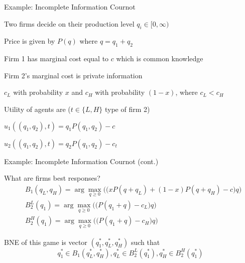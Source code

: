 \documentclass[11pt,aspectratio=169]{beamer}
\begin{document}
  
  \begin{frame}{Example: Incomplete Information Cournot}
   \begin{itemizes}[0.7em]
    \item Two firms decide on their production level $q_i \in [0, \infty)$
    \item Price is given by $P(q)$ where $q = q_1 + q_2$
    \item Firm 1 has marginal cost equal to $c$ which is common knowledge
    \item Firm 2's marginal cost is private information
     \begin{itemizes}[0.5em]
      \item $c_L$ with probability $x$ and $c_H$ with probability $(1-x)$, where $c_L < c_H$
     \end{itemizes}
    \item Utility of agents are ($t \in \{L, H\}$ type of firm 2)
     \begin{itemizes}[0.5em]
      \item $u_1((q_1,q_2), t) = q_1 P (q_1, q_2)-c$
      \item $u_2((q_1,q_2), t) = q_2 P (q_1, q_2)-c_t$
     \end{itemizes}
   \end{itemizes}
  \end{frame}
  
  
  \begin{frame}{Example: Incomplete Information Cournot (cont.)}
   \begin{itemizes}
    \item What are firms best responses?
    \begin{align*}
     & B_1(q_L,q_H)=\arg\max_{q\ge 0} \Big(\big(xP(q+q_L)+(1-x)P(q+q_H) - c\big) q\Big) \\
     & B_2^L(q_1)=\arg\max_{q\ge 0} \Big(\big(P(q_1+q) - c_L\big) q\Big) \\
     & B_2^H(q_1)= \arg\max_{q\ge 0} \Big(\big(P(q_1+q) - c_H\big) q\Big)
    \end{align*}
    \item BNE of this game is vector $(q_1^*,q_L^*,q_H^* )$ such that
    \begin{equation*}
     q_1^*\in B_1(q_L^*,q_H^*), q_L^*\in B_2^L(q_1^*), q_H^*\in B_2^H(q_1^*)
    \end{equation*}
   \end{itemizes}
  \end{frame}
  
\end{document}
